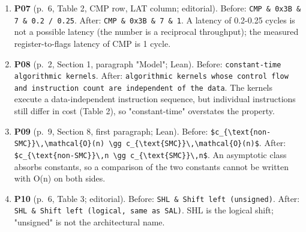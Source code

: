 \documentclass[9pt,twocolumn]{article}
\begin{document}
\begin{enumerate}[label=]
\item \textbf{P07} (p.~6, Table 2, CMP row, LAT column; editorial). Before: \texttt{CMP \& 0x3B \& 7 \& 0.2 / 0.25}. After: \texttt{CMP \& 0x3B \& 7 \& 1}. A latency of 0.2-0.25 cycles is not a possible latency (the number is a reciprocal throughput); the measured register-to-flags latency of CMP is 1 cycle. 
\item \textbf{P08} (p.~2, Section 1, paragraph "Model"; Lean). Before: \texttt{constant-time algorithmic kernels}. After: \texttt{algorithmic kernels whose control flow and instruction count are independent of the data}. The kernels execute a data-independent instruction sequence, but individual instructions still differ in cost (Table 2), so "constant-time" overstates the property. 
\item \textbf{P09} (p.~9, Section 8, first paragraph; Lean). Before: \texttt{\$c\_\{\textbackslash{}text\{non-SMC\}\}\textbackslash{},\textbackslash{}mathcal\{O\}(n) \textbackslash{}gg c\_\{\textbackslash{}text\{SMC\}\}\textbackslash{},\textbackslash{}mathcal\{O\}(n)\$}. After: \texttt{\$c\_\{\textbackslash{}text\{non-SMC\}\}\textbackslash{},n \textbackslash{}gg c\_\{\textbackslash{}text\{SMC\}\}\textbackslash{},n\$}. An asymptotic class absorbs constants, so a comparison of the two constants cannot be written with O(n) on both sides. 
\item \textbf{P10} (p.~6, Table 3; editorial). Before: \texttt{SHL \& Shift left (unsigned)}. After: \texttt{SHL \& Shift left (logical, same as SAL)}. SHL is the logical shift; "unsigned" is not the architectural name. 

\end{enumerate}
\end{document}
